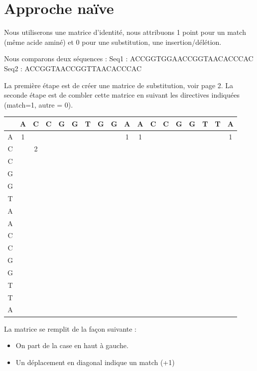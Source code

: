 \documentclass{article}
\begin{document}
\section{Approche naïve}

Nous utiliserons une matrice d’identité, nous attribuons 1 point pour un match (même acide aminé) et 0 pour une substitution, une insertion/délétion.

Nous comparons deux séquences : \newline
Seq1 : ACCGGTGGAACCGGTAACACCCAC \\
Seq2 : ACCGGTAACCGGTTAACACCCAC

La première étape est de créer une matrice de substitution, voir page 2. La seconde étape est de combler cette matrice en suivant les directives indiquées (match=1, autre = 0).

\begin{center}
\begin{tabular}{|c|c|c|c|c|c|c|c|c|c|c|c|c|c|c|c|c|c|}
\hline
 &A&C&C&G&G&T&G&G&A&A&C&C&G&G&T&T&A\\
\hline
A&1&& & & & & & &1&1& & & & & & &1\\
\hline
C& &2& & & & & & & & & & & & & & &\\
\hline
C& & & & & & & & & & & & & & & & &\\
\hline
G& & & & & & & & & & & & & & & & &\\
\hline
G& & & & & & & & & & & & & & & & &\\
\hline
T& & & & & & & & & & & & & & & & &\\
\hline
A& & & & & & & & & & & & & & & & &\\
\hline
A& & & & & & & & & & & & & & & & &\\
\hline
C& & & & & & & & & & & & & & & & &\\
\hline
C& & & & & & & & & & & & & & & & &\\
\hline
G& & & & & & & & & & & & & & & & &\\
\hline
G& & & & & & & & & & & & & & & & &\\
\hline
T& & & & & & & & & & & & & & & & &\\
\hline
T& & & & & & & & & & & & & & & & &\\
\hline
A& & & & & & & & & & & & & & & & &\\
\hline
\end{tabular}
    \end{center}


La matrice se remplit de la façon suivante :
\begin{itemize}
\item On part de la case en haut à gauche.
\item Un déplacement en diagonal indique un match (+1)
\end{itemize}
 
\end{document}

